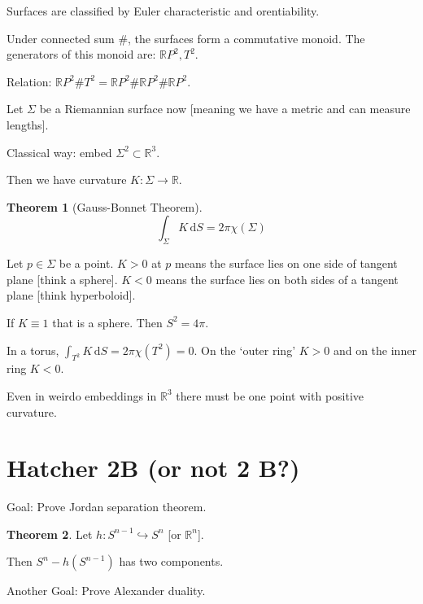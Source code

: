 \documentclass{article}
\theoremstyle{definition}
\newtheorem{theorem}{Theorem}
\begin{document}
    Surfaces are classified by Euler characteristic and orentiability.

    Under connected sum \(\#\), the surfaces form a commutative monoid. The generators of this monoid are: \(\mathbb{R} P^2, T^2\).

    Relation: \(\mathbb{R} P^2 \# T^2 = \mathbb{R} P^2 \# \mathbb{R} P^2 \# \mathbb{R} P^2\).

    Let \(\Sigma\) be a Riemannian surface now [meaning we have a metric and can measure lengths].

    Classical way: embed \(\Sigma^2 \subset \mathbb{R}^3\).

    Then we have curvature \(K: \Sigma \to \mathbb{R}\).

    \begin{theorem}
        [Gauss-Bonnet Theorem]

        \[
            \int_{\Sigma} K \,\mathrm{d}S = 2\pi \chi(\Sigma) 
        \]
    \end{theorem}

    Let \(p\in \Sigma\) be a point. \(K > 0\) at \(p\) means the surface lies on one side of tangent plane [think a sphere]. \(K < 0\) means the surface lies on both sides of a tangent plane [think hyperboloid].

    If \(K \equiv 1\) that is a sphere. Then \(S^2 = 4\pi\).

    In a torus, \(\int_{T^2} K \,\mathrm{d}S = 2\pi \chi(T^2) = 0\). On the `outer ring' \(K > 0\) and on the inner ring \(K < 0\). 

    Even in weirdo embeddings in \(\mathbb{R}^3\) there must be one point with positive curvature. 

    \section*{Hatcher 2B (or not 2 B?)}

    Goal: Prove Jordan separation theorem.

    \begin{theorem}
        Let \(h: S^{n-1} \hookrightarrow S^n\) [or \(\mathbb{R}^{n}\)].

        Then \(S^n - h(S^{n-1})\) has two components.
    \end{theorem}

    Another Goal: Prove Alexander duality.
\end{document}
